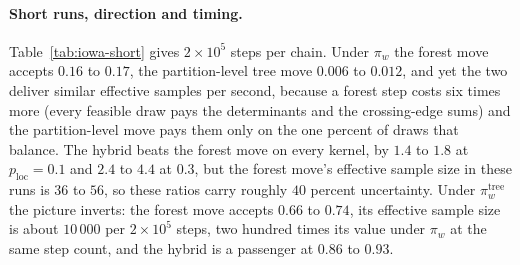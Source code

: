 \documentclass[11pt]{article}
\begin{document}
\paragraph{Short runs, direction and timing.} Table~\ref{tab:iowa-short}
gives $2 \times 10^5$ steps per chain. Under $\pi_w$ the forest move
accepts $0.16$ to $0.17$, the partition-level tree move $0.006$ to
$0.012$, and yet the two deliver similar effective samples per second,
because a forest step costs six times more (every feasible draw pays
the determinants and the crossing-edge sums) and the partition-level
move pays them only on the one percent of draws that balance. The
hybrid beats the forest move on every kernel, by $1.4$ to $1.8$ at
$p_{\mathrm{loc}} = 0.1$ and $2.4$ to $4.4$ at $0.3$, but the forest
move's effective sample size in these runs is $36$ to $56$, so these
ratios carry roughly $40$ percent uncertainty. Under
$\pi_w^{\mathrm{tree}}$ the picture inverts: the forest move accepts
$0.66$ to $0.74$, its effective sample size is about $10\,000$ per
$2 \times 10^5$ steps, two hundred times its value under $\pi_w$ at
the same step count, and the hybrid is a passenger at $0.86$ to
$0.93$.
\end{document}
